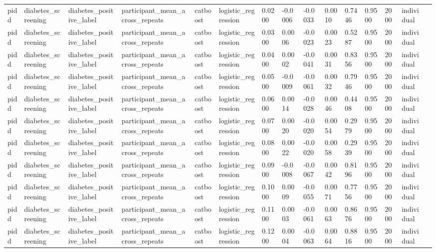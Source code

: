 \begin{tabular}{lllllllllllllll}
pidd & diabetes\_screening & diabetes\_positive\_label & participant\_mean\_across\_repeats & catboost & logistic\_regression & 0.0200 & -0.0006 & -0.0033 & 0.0010 & 0.7446 & 0.9500 & 2000 & individual &  \\
pidd & diabetes\_screening & diabetes\_positive\_label & participant\_mean\_across\_repeats & catboost & logistic\_regression & 0.0300 & 0.0006 & -0.0023 & 0.0023 & 0.5287 & 0.9500 & 2000 & individual &  \\
pidd & diabetes\_screening & diabetes\_positive\_label & participant\_mean\_across\_repeats & catboost & logistic\_regression & 0.0400 & 0.0002 & -0.0041 & 0.0031 & 0.8356 & 0.9500 & 2000 & individual &  \\
pidd & diabetes\_screening & diabetes\_positive\_label & participant\_mean\_across\_repeats & catboost & logistic\_regression & 0.0500 & -0.0009 & -0.0061 & 0.0032 & 0.7946 & 0.9500 & 2000 & individual &  \\
pidd & diabetes\_screening & diabetes\_positive\_label & participant\_mean\_across\_repeats & catboost & logistic\_regression & 0.0600 & 0.0014 & -0.0028 & 0.0046 & 0.4408 & 0.9500 & 2000 & individual &  \\
pidd & diabetes\_screening & diabetes\_positive\_label & participant\_mean\_across\_repeats & catboost & logistic\_regression & 0.0700 & 0.0020 & -0.0020 & 0.0054 & 0.2979 & 0.9500 & 2000 & individual &  \\
pidd & diabetes\_screening & diabetes\_positive\_label & participant\_mean\_across\_repeats & catboost & logistic\_regression & 0.0800 & 0.0022 & -0.0020 & 0.0058 & 0.2939 & 0.9500 & 2000 & individual &  \\
pidd & diabetes\_screening & diabetes\_positive\_label & participant\_mean\_across\_repeats & catboost & logistic\_regression & 0.0900 & -0.0008 & -0.0067 & 0.0042 & 0.8196 & 0.9500 & 2000 & individual &  \\
pidd & diabetes\_screening & diabetes\_positive\_label & participant\_mean\_across\_repeats & catboost & logistic\_regression & 0.1000 & 0.0009 & -0.0055 & 0.0071 & 0.7756 & 0.9500 & 2000 & individual &  \\
pidd & diabetes\_screening & diabetes\_positive\_label & participant\_mean\_across\_repeats & catboost & logistic\_regression & 0.1100 & 0.0003 & -0.0061 & 0.0063 & 0.8676 & 0.9500 & 2000 & individual &  \\
pidd & diabetes\_screening & diabetes\_positive\_label & participant\_mean\_across\_repeats & catboost & logistic\_regression & 0.1200 & 0.0004 & -0.0063 & 0.0064 & 0.8816 & 0.9500 & 2000 & individual &  \\

\end{tabular}
